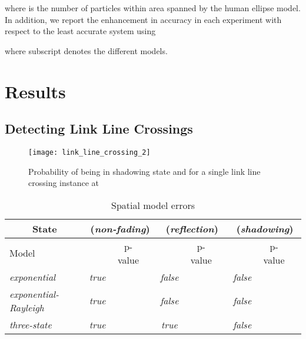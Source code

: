\documentclass[journal, 10pt, twocolumn, balance]{IEEEtran}
\begin{document}
where  is the number of particles within area  spanned by the human ellipse model. In addition, we report the enhancement in accuracy in each experiment with respect to the least accurate system using 

where subscript  denotes the different models. 



\section{Results} \label{S:results}
\subsection{Detecting Link Line Crossings}\label{sec:link_crossing_results}

\begin{figure}[!t]
\begin{centering}
\texttt{[image: link\_line\_crossing\_2]}
\caption{Probability of being in shadowing state and  for a single link line crossing instance at } 
\label{fig:hmm_state_estimate}
\end{centering}
\end{figure}

\begin{table*}[!t]
    \caption{Spatial model errors} \centering \renewcommand{\arraystretch}{1.1}\begin{tabular}{| l l l || c c c | c c c | c c c |} 
	\hline\hline
        \multicolumn{3}{|c||}{State}  & \multicolumn{3}{c|}{ (\emph{non-fading})} 
				      &	\multicolumn{3}{c|}{ (\emph{reflection})} 
				      & \multicolumn{3}{c|}{ (\emph{shadowing})} \\
        \hline 
	{Model} & & &   & p-value &  
				    &   & p-value &  
				    &   & p-value &  \\
	\hline 
        \multicolumn{3}{|l||}{\emph{exponential}} & \emph{true} &  &   
				        & \emph{false} &  & 
					& \emph{false} &  &  \\
					
	\multicolumn{3}{|l||}{\emph{exponential-Rayleigh}} & \emph{true} &  &   
				        & \emph{false} &  & 
					& \emph{false} &  &  \\
					
	\multicolumn{3}{|l||}{\emph{three-state}} & \emph{true} &  &   
				        & \emph{true} &  & 
					& \emph{false} &  &  \\
        \hline \end{tabular}
        \label{table:model_errors} \end{table*}
\end{document}
